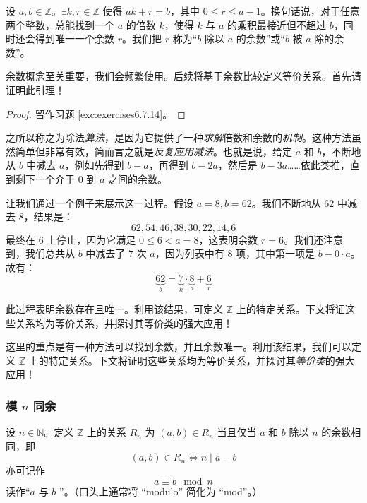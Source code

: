 \begin{lemma}[除法算法]\label{lemma6.5.2}
    设 $a,b \in \mathbb{Z}$。$\exists k, r \in \mathbb{Z}$ 使得 $ak + r = b$，其中 $0 \le r \le a - 1$。换句话说，对于任意两个整数，总能找到一个 $a$ 的倍数 $k$，使得 $k$ 与 $a$ 的乘积最接近但不超过 $b$，同时还会得到唯一一个余数 $r$。我们把 $r$ 称为``$b$ 除以 $a$ 的余数''或``$b$ 被 $a$ 除的余数''。
\end{lemma}

余数概念至关重要，我们会频繁使用。后续将基于余数比较定义等价关系。首先请证明此引理！

\begin{proof}
    留作习题 \ref{exc:exercises6.7.14}。
\end{proof}

之所以称之为除法\emph{算法}，是因为它提供了一种\emph{求解}倍数和余数的\emph{机制}。这种方法虽然简单但非常有效，简而言之就是\emph{反复应用减法}。也就是说，给定 $a$ 和 $b$，不断地从 $b$ 中减去 $a$，例如先得到 $b - a$，再得到 $b - 2a$，然后是 $b - 3a$……依此类推，直到剩下一个介于 $0$ 到 $a$ 之间的余数。

\begin{example}
    让我们通过一个例子来展示这一过程。假设 $a = 8, b = 62$。我们不断地从 $62$ 中减去 $8$，结果是：
    \[62, 54, 46, 38, 30, 22, 14, 6\]
    最终在 $6$ 上停止，因为它满足 $0 \le 6 < a = 8$，这表明余数 $r = 6$。我们还注意到，我们总共从 $b$ 中减去了 $7$ 次 $a$，因为列表中有 $8$ 项，其中第一项是 $b - 0 \cdot a$。故有：
    \[\underbrace{62}_{b} = \underbrace{7}_{k} \cdot \underbrace{8}_{a} + \underbrace{6}_{r}\]
\end{example}

此过程表明余数存在且唯一。利用该结果，可定义 $\mathbb{Z}$ 上的特定关系。下文将证这些关系均为等价关系，并探讨其等价类的强大应用！

这里的重点是有一种方法可以找到余数，并且余数唯一。利用该结果，我们可以定义 $\mathbb{Z}$ 上的特定关系。下文将证明这些关系均为等价关系，并探讨其\emph{等价类}的强大应用！

\subsubsection*{模 $n$ 同余}

\begin{definition}\label{def:definition6.5.4}
    设 $n \in \mathbb{N}$。定义 $\mathbb{Z}$ 上的关系 $R_n$ 为 $(a,b) \in R_n$ 当且仅当 $a$ 和 $b$ 除以 $n$ 的余数相同，即
    \[(a,b) \in R_n \iff n \mid a-b\] 
    亦可记作
    \[a \equiv b \mod n\]
    读作``$a$ 与 $b$ ''。（口头上通常将 ``modulo'' 简化为 ``mod''。）
\end{definition}

